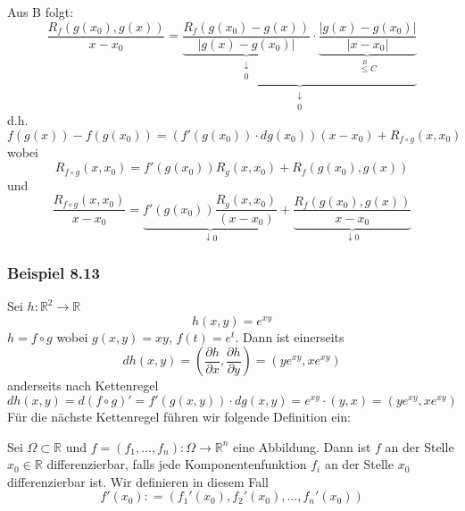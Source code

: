 Aus B folgt:
\[\frac{{{R_f}\left( {g\left( {{x_0}} \right),g\left( x \right)} \right)}}{{x - {x_0}}} = \underbrace {\underbrace {\frac{{{R_f}\left( {g\left( {{x_0}} \right) - g\left( x \right)} \right)}}{{\left| {g\left( x \right) - g\left( {{x_0}} \right)} \right|}}}_{\begin{array}{*{20}{c}}
 \downarrow \\
0
\end{array}} \cdot \underbrace {\frac{{\left| {g\left( x \right) - g\left( {{x_0}} \right)} \right|}}{{\left| {x - {x_0}} \right|}}}_{\mathop  \le \limits^B C}}_{\begin{array}{*{20}{c}}
 \downarrow \\
0
\end{array}}\]
d.h.
\[f\left( {g\left( x \right)} \right) - f\left( {g\left( {{x_0}} \right)} \right) = \left( {f'\left( {g\left( {{x_0}} \right)} \right) \cdot dg\left( {{x_0}} \right)} \right)\left( {x - {x_0}} \right) + {R_{f \circ g}}\left( {x,{x_0}} \right)\]
wobei
\[{R_{f \circ g}}\left( {x,{x_0}} \right) = f'\left( {g\left( {{x_0}} \right)} \right){R_g}\left( {x,{x_0}} \right) + {R_f}\left( {g\left( {{x_0}} \right),g\left( x \right)} \right)\]
und 
\[\frac{{{R_{f \circ g}}\left( {x,{x_0}} \right)}}{{x - {x_0}}} = \underbrace {f'\left( {g\left( {{x_0}} \right)} \right)\frac{{{R_g}\left( {x,{x_0}} \right)}}{{\left( {x - {x_0}} \right)}}}_{ \downarrow 0} + \underbrace {\frac{{{R_f}\left( {g\left( {{x_0}} \right),g\left( x \right)} \right)}}{{x - {x_0}}}}_{ \downarrow 0}\]

\subsubsection*{Beispiel 8.13}
Sei $h:\mathbb{R}^2\rightarrow\mathbb{R}$ $$h(x,y)=e^{xy}$$ $h= f\circ g$ wobei $g(x,y)=xy$, $f(t)=e^t$. Dann ist einerseits \[dh\left( {x,y} \right) = \left( {\frac{{\partial h}}{{\partial x}},\frac{{\partial h}}{{\partial y}}} \right) = \left( {y{e^{xy}},x{e^{xy}}} \right)\] anderseits nach Kettenregel 
\[dh\left( {x,y} \right) = d\left( {f \circ g} \right)' = f'\left( {g\left( {x,y} \right)} \right) \cdot dg\left( {x,y} \right) = {e^{xy}} \cdot \left( {y,x} \right) = \left( {y{e^{xy}},x{e^{xy}}} \right)\]
Für die nächste Kettenregel führen wir folgende Definition ein:

\begin{definition}{8.14}
Sei $\Omega \subset\mathbb{R}$ und $f=\left( f_1,\dots,f_n\right):\Omega\rightarrow\mathbb{R}^n$ eine Abbildung. Dann ist $f$ an der Stelle $x_0\in\mathbb{R}$ differenzierbar, falls jede Komponentenfunktion $f_i$ an der Stelle $x_0$ differenzierbar ist. Wir definieren in diesem Fall \[f'\left( {{x_0}} \right): = \left( {{f_1}'\left( {{x_0}} \right),{f_2}'\left( {{x_0}} \right), \ldots ,{f_n}'\left( {{x_0}} \right)} \right)\]
\end{definition}

